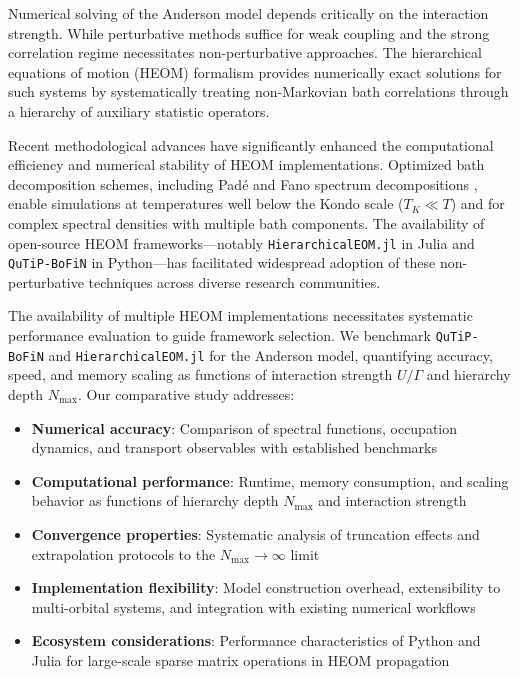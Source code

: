 \documentclass[preprint,1p]{elsarticle}
\begin{document}
Numerical solving of the Anderson model depends critically on the interaction strength. While perturbative methods suffice for weak coupling \cite{breuer2002theory} and the strong correlation regime necessitates non-perturbative approaches. The hierarchical equations of motion (HEOM) formalism \cite{tanimura1989nonperturbative,tanimura2020numerically} provides numerically exact solutions for such systems by systematically treating non-Markovian bath correlations through a hierarchy of auxiliary statistic operators.


Recent methodological advances have significantly enhanced the computational efficiency and numerical stability of HEOM implementations. Optimized bath decomposition schemes, including Padé \cite{hu2010pade} and Fano spectrum decompositions \cite{zhang2020hierarchical}, enable simulations at temperatures well below the Kondo scale ($T_K \ll T$) and for complex spectral densities with multiple bath components. The availability of open-source HEOM frameworks—notably \texttt{HierarchicalEOM.jl} \cite{HierarchicalEOM-jl2023} in Julia and \texttt{QuTiP-BoFiN} \cite{lambert2023qutip} in Python—has facilitated widespread adoption of these non-perturbative techniques across diverse research communities.


The availability of multiple HEOM implementations necessitates systematic performance evaluation to guide framework selection. We benchmark \texttt{QuTiP-BoFiN} and \texttt{HierarchicalEOM.jl} for the Anderson model, quantifying accuracy, speed, and memory scaling as functions of interaction strength $U/ \Gamma$ and hierarchy depth $N_{\text{max}}$. Our comparative study addresses:

\begin{itemize}
	\item \textbf{Numerical accuracy}: Comparison of spectral functions, occupation dynamics, and transport observables with established benchmarks
	\item \textbf{Computational performance}: Runtime, memory consumption, and scaling behavior as functions of hierarchy depth $N_{\text{max}}$ and interaction strength
	\item \textbf{Convergence properties}: Systematic analysis of truncation effects and extrapolation protocols to the $N_{\text{max}} \to \infty$ limit
	\item \textbf{Implementation flexibility}: Model construction overhead, extensibility to multi-orbital systems, and integration with existing numerical workflows
	\item \textbf{Ecosystem considerations}: Performance characteristics of Python and Julia for large-scale sparse matrix operations in HEOM propagation
\end{itemize}
\end{document}

